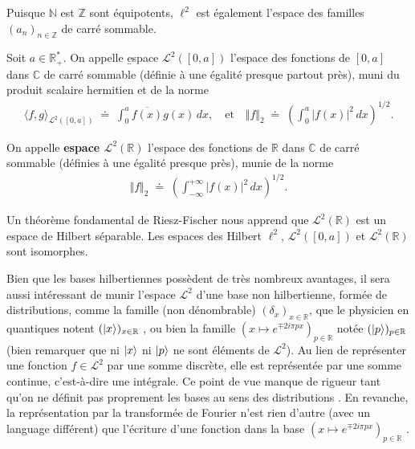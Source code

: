 \begin{Rema}Puisque $\mathbb N$ est $\mathbb Z$ sont équipotents, $\ell^2$ est également l'espace des familles $(a_n)_{n \in \mathbb Z }$ de carré sommable.\end{Rema}


\begin{Defi}
    Soit $a \in \mathbb R^\ast_+$. On appelle {\b espace $\mathcal L^2([0 , a])$} l'espace des fonctions de $[0 , a]$ dans $\mathbb C$ de carré sommable (définie à une égalité presque partout près), muni du produit scalaire hermitien et de la norme 
    \begin{eqnarray}
        \langle f , g \rangle_{\mathcal L^2([0,a])} \; \doteq \; \int_0^a \overline{f(x)} g ( x) \, dx , \quad \mbox{et} \quad  \Vert f \Vert_2 \; \doteq \; \left (  \int_0^a \vert f (x) \vert ^2 \, dx \right )^{1/2}.
    \end{eqnarray}
\end{Defi}

\begin{Defi} 
    On appelle {\bf espace $\mathcal L^2(\mathbb R )$} l'espace des fonctions de $\mathbb R$ dans $\mathbb C$ de carré sommable (définies à une égalité presque près), munie de la norme 
    \begin{eqnarray}
        \Vert f \Vert_2 \; \doteq \; \left (  \int_{-\infty}^{+\infty} \vert f (x) \vert ^2 \, dx \right )^{1/2}.
    \end{eqnarray}
\end{Defi}

Un théorème fondamental de Riesz-Fischer nous apprend que $\mathcal L^2(\mathbb R)$ est un espace de Hilbert séparable. Les espaces des Hilbert $\ell^2$, $\mathcal L^2([0 , a])$ et $\mathcal L^2(\mathbb R)$ sont isomorphes. 

\smallskip


\begin{Rema}
    Bien que les bases hilbertiennes possèdent de très nombreux avantages, il sera aussi intéressant de munir l'espace $\mathcal L^2$ d'une \guillemotleft{}base\guillemotright{} non hilbertienne, formée de distributions, comme la famille (non dénombrable) $(\delta_x)_{x\in \mathbb R}$, que le physicien en quantiques notent $(\ket{x})_{x\in \mathbb R}$ , ou bien la famille $( x \mapsto e^{\mp 2 i  \pi p x } )_{p\in \mathbb R}$ notée $(\ket{p})_{p\in \mathbb R}$ (bien remarquer que ni $\ket{x}$ ni $\ket{p}$ ne sont éléments de $\mathcal L^2$). Au lien de représenter une fonction $f\in \mathcal L^2$ par une somme discrète, elle est représentée par une somme \guillemotleft{}continue\guillemotright{}, c'est-à-dire une intégrale. Ce point de vue manque de rigueur tant qu'on ne définit pas proprement les bases \guillemotleft au sens des distributions \guillemotright. En revanche, la représentation par la transformée de Fourier n'est rien d'autre (avec un language différent) que l'écriture d'une fonction \guillemotleft dans la base $( x \mapsto e^{\mp 2 i  \pi p x } )_{p\in \mathbb R}$ \guillemotright.
\end{Rema}

